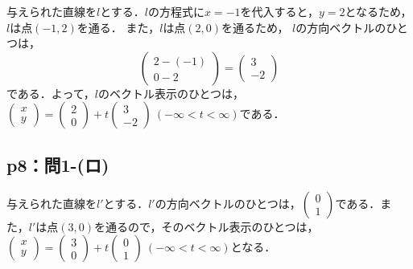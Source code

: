 \documentclass[a4paper,10pt,fleqn]{ltjsarticle}
\begin{document}
\begin{tleftbar}
    与えられた直線を$l$とする．$l$の方程式に$x=-1$を代入すると，$y=2$となるため，$l$は点$(-1,2)$を通る．
    また，$l$は点$(2,0)$を通るため，
    $l$の方向ベクトルのひとつは，
    \[
        \begin{pmatrix}
            2-(-1) \\
            0-2
        \end{pmatrix}
        =
        \begin{pmatrix}
            3 \\
            -2
        \end{pmatrix}
    \]
    である．よって，$l$のベクトル表示のひとつは，
    $
        \begin{pmatrix}
            x \\
            y
        \end{pmatrix}
        =
        \begin{pmatrix}
            2 \\
            0
        \end{pmatrix}
        +t
        \begin{pmatrix}
            3 \\
            -2
        \end{pmatrix}
        ~(-\infty < t < \infty)$である．
\end{tleftbar}


\subsection*{p8：問1-(ロ)}

\begin{tleftbar}
    与えられた直線を$l'$とする．$l '$の方向ベクトルのひとつは，$
        \begin{pmatrix}
            0 \\
            1
        \end{pmatrix}
    $である．また，$l '$は点$(3,0)$を通るので，そのベクトル表示のひとつは，
    $
        \begin{pmatrix}
            x \\
            y
        \end{pmatrix}
        =
        \begin{pmatrix}
            3 \\
            0
        \end{pmatrix}
        +t
        \begin{pmatrix}
            0 \\
            1
        \end{pmatrix}
        ~(-\infty < t < \infty)
    $となる．
\end{tleftbar}
\end{document}
